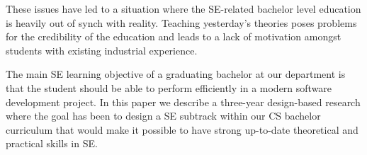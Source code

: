 \documentclass{sig-alternate}
\begin{document}
These issues have led to a situation where the SE-related bachelor level education is heavily out of synch with reality. Teaching yesterday's theories poses problems for the credibility of the education and leads to a lack of motivation amongst students with existing industrial experience.

The main SE learning objective of a graduating bachelor at our department is that the student should be able to perform efficiently in a modern software development project. In this paper we describe a three-year design-based research where the goal has been to design a SE subtrack within our CS bachelor curriculum that would make it possible to have strong up-to-date theoretical and practical skills in SE.



\end{document}
